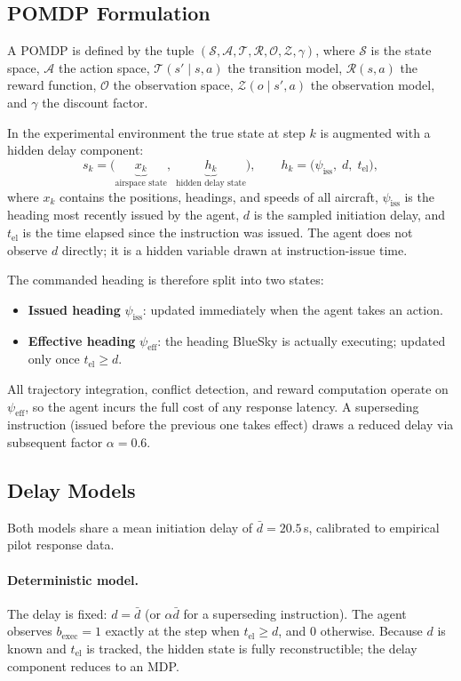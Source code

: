 \documentclass[11pt, a4paper]{article}
\begin{document}
\subsection{POMDP Formulation}

A POMDP is defined by the tuple $(\mathcal{S}, \mathcal{A}, \mathcal{T}, \mathcal{R}, \mathcal{O}, \mathcal{Z}, \gamma)$, where $\mathcal{S}$ is the state space, $\mathcal{A}$ the action space, $\mathcal{T}(s'\mid s,a)$ the transition model, $\mathcal{R}(s,a)$ the reward function, $\mathcal{O}$ the observation space, $\mathcal{Z}(o\mid s',a)$ the observation model, and $\gamma$ the discount factor.

In the experimental environment the true state at step $k$ is augmented with a hidden delay component:
\[
  s_k = \bigl(\underbrace{x_k}_{\text{airspace state}},\;\underbrace{h_k}_{\text{hidden delay state}}\bigr),
  \qquad
  h_k = \bigl(\psi_\text{iss},\; d,\; t_\text{el}\bigr),
\]
where $x_k$ contains the positions, headings, and speeds of all aircraft, $\psi_\text{iss}$ is the heading most recently issued by the agent, $d$ is the sampled initiation delay, and $t_\text{el}$ is the time elapsed since the instruction was issued. The agent does not observe $d$ directly; it is a hidden variable drawn at instruction-issue time.

The commanded heading is therefore split into two states:
\begin{itemize}\itemsep2pt
  \item \textbf{Issued heading} $\psi_\text{iss}$: updated immediately when the agent takes an action.
  \item \textbf{Effective heading} $\psi_\text{eff}$: the heading BlueSky is actually executing; updated only once $t_\text{el} \geq d$.
\end{itemize}
All trajectory integration, conflict detection, and reward computation operate on $\psi_\text{eff}$, so the agent incurs the full cost of any response latency. A superseding instruction (issued before the previous one takes effect) draws a reduced delay via subsequent factor $\alpha = 0.6$.

\subsection{Delay Models}
\label{sec:delay_models}

Both models share a mean initiation delay of $\bar{d} = 20.5$\,s, calibrated to empirical pilot response data.

\paragraph{Deterministic model.}
The delay is fixed: $d = \bar{d}$ (or $\alpha\bar{d}$ for a superseding instruction). The agent observes $b_\text{exec}=1$ exactly at the step when $t_\text{el}\ge d$, and $0$ otherwise. Because $d$ is known and $t_\text{el}$ is tracked, the hidden state is fully reconstructible; the delay component reduces to an MDP.
\end{document}
